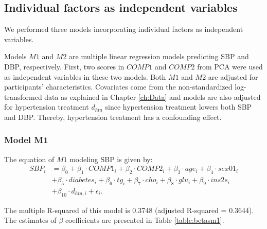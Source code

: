 \subsection{Individual factors as independent variables}
We performed three models incorporating individual factors as independent variables.

Models $M1$ and $M2$ are multiple linear regression models predicting SBP and DBP, respectively. First, two scores in $COMP1$ and $COMP2$ from PCA were used as independent variables in these two models. Both $M1$ and $M2$ are adjusted for participants' characteristics. Covariates come from the non-standardized log-transformed data as explained in Chapter \ref{ch:Data} and models are also adjusted for hypertension treatment $d_{hta}$ since hypertension treatment lowers both SBP and DBP. Thereby, hypertension treatment has a confounding effect. 

\subsubsection{Model M1}
The equation of $M1$ modeling SBP is given by:
\begin{align*}
SBP_i &=  \beta_0 + \beta_1 \cdot COMP1_i+ \beta_2 \cdot COMP2_i + \beta_3 \cdot age_i + \beta_4 \cdot sex01_i  \\
& +\beta_5 \cdot diabetes_i +\beta_6 \cdot tg_i +\beta_7 \cdot cho_i +\beta_8 \cdot glu_i +\beta_9 \cdot ins2s_i \\
&+ \beta_{10} \cdot d_{hta,i}+ \epsilon_i.
\end{align*}

The multiple R-squared of this model is 0.3748 (adjusted R-squared = 0.3644). The estimates of $\beta$ coefficients are presented in Table \ref{table:betasm1}.

